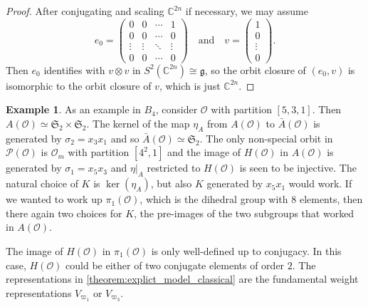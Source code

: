 \documentclass{amsart}
\theoremstyle{definition}
\newtheorem{example}[theorem]{Example}
\newcommand{\C}{\mathbb{C}}
\newcommand{\cP}{\mathcal{P}}
\newcommand{\g}{\mathfrak{g}}
\newcommand{\Ab}{\bar{A}}
\newcommand{\0}{\mathcal{O}}
\begin{document}
\begin{proof}
After conjugating and scaling $\C^{2n}$ if necessary, we may assume $$e_0=\begin{pmatrix} 0 & 0 & \cdots & 1 \\ 0 & 0 & \cdots & 0 \\ \vdots & \vdots & \ddots & \vdots \\ 0 & 0 & \cdots & 0 \end{pmatrix}\quad\mbox{and}\quad v=\begin{pmatrix} 1 \\ 0 \\ \vdots \\ 0 \end{pmatrix}.$$
Then $e_0$ identifies with $v\otimes v$ in $S^2(\C^{2n})\cong\g$, so the orbit closure of $(e_0,v)$ is isomorphic to the orbit closure of $v$, which is just $\C^{2n}$.
\end{proof}



\begin{example}\label{Example:B_4}
    As an example in $B_4$, consider $\0$ with partition $[5,3,1]$.  
Then $A(\0) \simeq \mathfrak{S}_2 \times \mathfrak{S}_2$.
The kernel of the map $\eta_A$ 
from $A(\0)$ to $\Ab(\0)$ 
is generated by $\sigma_2 =x_3x_1$ 
and so $\bar{A}(\0) \simeq \mathfrak{S}_2$.
The only non-special orbit in $\cP(\0)$
is $\0_m$ with partition $[4^2,1]$
and the image of $H(\0)$ in $A(\0)$ 
is generated by $\sigma_1=x_5x_3$ and $\eta|_A$ restricted to $H(\0)$ 
is seen to be injective.  
The natural choice of $K$ is $\ker(\eta_A)$, 
but also $K$ generated by $x_5x_1$ would work.  
If we wanted to work up $\pi_1(\0)$,
which is the dihedral group with $8$ elements, then 
there again two choices for $K$, the pre-images of the two subgroups that worked
in $A(\0)$.

The image of $H(\0)$ in $\pi_1(\0)$ is only well-defined up to conjugacy.  In this case, $H(\0)$ could be either 
of two conjugate elements of order $2$.  The representations in \cref{theorem:explict_model_classical} are the fundamental weight representations $V_{\varpi_1}$ or $V_{\varpi_3}$. 
\end{example}




\end{document}
